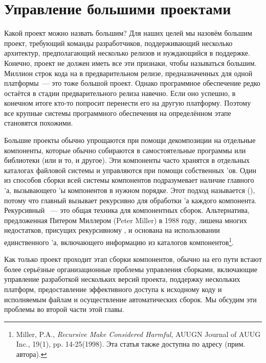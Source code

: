 \chapter{Управление большими проектами}
\label{chap:managing_large_proj}

Какой проект можно назвать большим? Для наших целей мы назовём большим
проект, требующий команды разработчиков, поддерживающий несколько
архитектур, предполагающий несколько релизов и нуждающийся в
поддержке. Конечно, проект не должен иметь все эти признаки, чтобы
называться большим. Миллион строк кода на \Cplusplus{} в
предварительном релизе, предназначенных для одной платформы~--- это
тоже большой проект. Однако программное обеспечение редко остаётся в
стадии предварительного релиза навечно. Если оно успешно, в конечном
итоге кто-то попросит перенести его на другую платформу. Поэтому все
крупные системы программного обеспечения на определённом этапе
становятся похожими.

Большие проекты обычно упрощаются при помощи декомпозиции на отдельные
компоненты, которые обычно собираются в самостоятельные программы или
библиотеки (или и то, и другое). Эти компоненты часто хранятся в
отдельных каталогах файловой системы и управляются при помощи
собственных \Makefile{}'ов. Один из способов сборки всей системы
компонентов подразумевает наличие главного \Makefile{}'а,
вызывающего \Makefile{}'ы компонентов в нужном порядке. Этот подход
называется  (), потому что главный \Makefile{} вызывает \GNUmake{}
рекурсивно для обработки \Makefile{}'а каждого компонента. Рекурсивный
\GNUmake{}~--- это общая техника для компонентных
сборок. Альтернатива, предложенная Питером Миллером (Peter Miller) в
1988 году, лишена многих недостатков, присущих рекурсивному
\GNUmake{}, и основана на использовании единственного \Makefile{}'а,
включающего информацию из каталогов компонентов\footnote{
Miller, P.A., \emph{Recursive Make Considered Harmful}, AUUGN Journal
of AUUG Inc., 19(1), pp. 14-25(1998). Эта статья также доступна по
адресу  (прим.
автора).}.

Как только проект проходит этап сборки компонентов, обычно на его пути
встают более серьёзные организационные проблемы управления
сборками, включающие управление разработкой нескольких версий проекта,
поддержку нескольких платформ, предоставление эффективного доступа к
исходному коду и исполняемым файлам и осуществление автоматических
сборок. Мы обсудим эти проблемы во второй части этой главы.






